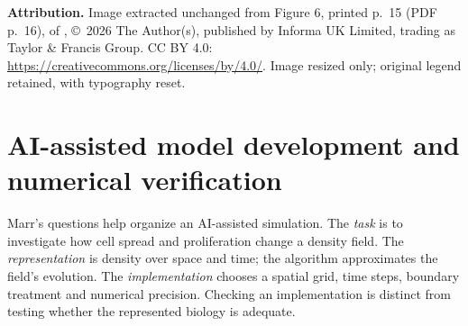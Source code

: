 \documentclass[11pt,a4paper]{article}
\begin{document}
\medskip
{\footnotesize\textbf{Attribution.} Image extracted unchanged from Figure 6, printed p.~15 (PDF p.~16), of \citet{lundervold2026glioma}, \copyright~2026 The Author(s), published by Informa UK Limited, trading as Taylor \& Francis Group. CC BY 4.0: \url{https://creativecommons.org/licenses/by/4.0/}. Image resized only; original legend retained, with typography reset.}
\clearpage


\section{AI-assisted model development and numerical verification}\label{sec:growth}
Marr's questions help organize an AI-assisted simulation. The \emph{task} is to investigate how cell spread and proliferation change a density field. The \emph{representation} is density over space and time; the algorithm approximates the field's evolution. The \emph{implementation} chooses a spatial grid, time steps, boundary treatment and numerical precision. Checking an implementation is distinct from testing whether the represented biology is adequate.
\end{document}
